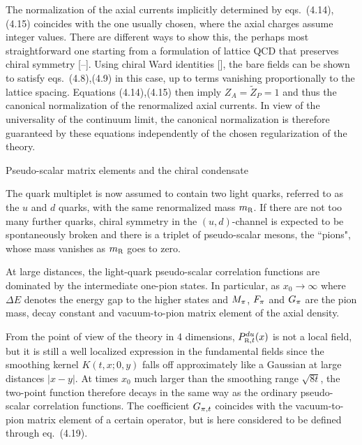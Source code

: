 The normalization of the axial currents
implicitly determined by eqs.~(4.14),(4.15) coincides with
the one usually chosen, where the axial charges
assume integer values. There are different ways to 
show this, the perhaps most straightforward one starting from
a formulation of lattice QCD that preserves chiral symmetry 
[\cite{GinspargWilson}--\cite{ExactChSy}].
Using chiral Ward identities [\cite{BoulderReview}],
the bare fields can be shown to satisfy eqs.~(4.8),(4.9) in this case,
up to terms vanishing proportionally to the lattice spacing.
Equations (4.14),(4.15) then imply
$Z_A=\tilde{Z}_P=1$ and thus the canonical normalization of 
the renormalized axial currents. In view of the universality of the
continuum limit,
the canonical normalization is therefore guaranteed 
by these equations independently 
of the chosen regularization of the theory.


 Pseudo-scalar matrix elements and the chiral condensate

The quark multiplet is now assumed to contain two light quarks, 
referred to as the $u$ and $d$ quarks, with the same
renormalized mass $\ren{m}$.
If there are not too many further
quarks, chiral symmetry in the $(u,d)$-channel 
is expected to be spontaneously broken and there is a triplet of 
pseudo-scalar mesons, the ``pions", whose mass vanishes
as $\ren{m}$ goes to zero.

At large distances, the light-quark pseudo-scalar correlation
functions are dominated by the intermediate one-pion states.
In particular, as $x_0\to\infty$
where $\Delta E$ denotes the energy gap to the higher states and
$M_{\pi}$, $F_{\pi}$ and $G_{\pi}$ are the pion mass, 
decay constant and vacuum-to-pion matrix element of the axial 
density.

From the point of view of the theory in 4 dimensions,
$\rens{\Pax}{t}^{du}(x)$ is not a local field, but
it is still a well localized expression in the fundamental fields
since the smoothing kernel $K(t,x;0,y)$ falls off approximately 
like a Gaussian at large distances $|x-y|$.
At times $x_0$ much larger than the smoothing range $\sqrt{8t}$, 
the two-point function
therefore decays in the same way as the ordinary pseudo-scalar
correlation functions.
The coefficient $G_{\pi,t}$ coincides with
the vacuum-to-pion matrix element of a certain operator,
but is here considered to be defined through eq.~(4.19).

